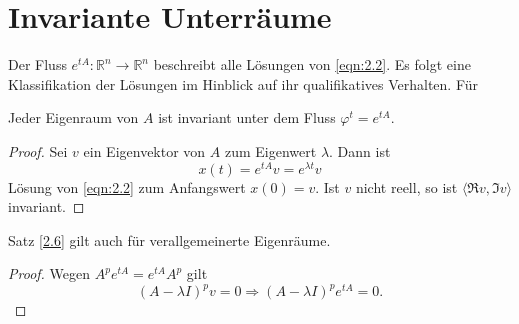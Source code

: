 \documentclass[main.tex]{subfiles}
\begin{document}
\section{Invariante Unterräume}\label{section:2.3}
Der Fluss $e^{tA}\colon ℝ^n \to ℝ^n$ beschreibt alle Lösungen von \eqref{eqn:2.2}. Es folgt eine Klassifikation der Lösungen im Hinblick auf ihr qualifikatives Verhalten. Für
\begin{satz}\label{2.6}
Jeder Eigenraum von $A$ ist invariant unter dem Fluss $φ^t = e^{tA}$.
\end{satz}

\begin{proof}
Sei $v$ ein Eigenvektor von $A$ zum Eigenwert $λ$. Dann ist 
$$x(t) = e^{tA} v = e^{λt} v$$
Lösung von \eqref{eqn:2.2} zum Anfangswert $x(0) = v$. Ist $v$ nicht reell, so ist $\langle \Re{v}, \Im{v} \rangle$ invariant.
\end{proof}

\begin{bem}\label{2.7}
Satz \ref{2.6} gilt auch für verallgemeinerte Eigenräume.
\end{bem}
\begin{proof}
Wegen $A^p e^{tA} = e^{tA} A^p$ gilt
$$(A-λI)^p v = 0\Rightarrow (A-λI)^p e^{tA} = 0.$$
\end{proof}
\end{document}
